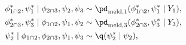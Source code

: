 \begin{align}
  \phi_{1 \cap 2}^{*}, \psi_{1}^{*} \mid \phi_{2 \cap 3}, \psi_{2}, \psi_{3} &\sim \pd_{\text{meld}, 1}(\phi_{1 \cap 2}^{*}, \psi_{1}^{*} \mid Y_{1}), \label{eqn:stage-two-proposals-one} \\
  \phi_{2 \cap 3}^{*}, \psi_{3}^{*} \mid \phi_{1 \cap 2}, \psi_{1}, \psi_{2} &\sim \pd_{\text{meld}, 3}(\phi_{2 \cap 3}^{*}, \psi_{3}^{*} \mid Y_{3}), \label{eqn:stage-two-proposals-two} \\
  \psi_{2}^{*} \mid \phi_{1 \cap 2}, \phi_{2 \cap 3}, \psi_{1}, \psi_{3} &\sim \q(\psi_{2}^{*} \mid \psi_{2}),
  \label{eqn:stage-two-proposals-three}
\end{align}